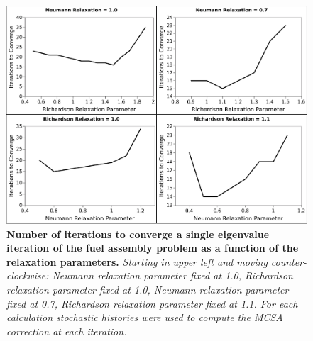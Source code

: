 \begin{figure}[t!]
  \begin{center}
    \includegraphics[width=6in]{chapters/spn_equations/relax_iters.pdf}
  \end{center}
  \caption{\textbf{Number of iterations to converge a single
      eigenvalue iteration of the fuel assembly problem as a function
      of the relaxation parameters.} \textit{Starting in upper left
      and moving counter-clockwise: Neumann relaxation parameter fixed
      at 1.0, Richardson relaxation parameter fixed at 1.0, Neumann
      relaxation parameter fixed at 0.7, Richardson relaxation
      parameter fixed at 1.1. For each calculation 
      stochastic histories were used to compute the MCSA correction at
      each iteration.}}
  \label{fig:relax_iters}
\end{figure}

